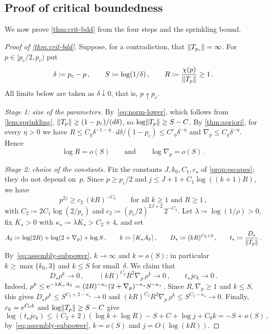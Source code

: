 \subsection{Proof of critical boundedness}\label{sec:assembly}

We now prove \cref{thm:crit-bdd} from the four steps and the sprinkling bound.

\begin{proof}[Proof of \cref{thm:crit-bdd}]
Suppose, for a contradiction, that $\lVert T_{p_c}\rVert=\infty$. For $p\in[p_c/2,p_c)$ put
\begin{equation*}
  \delta\coloneqq p_c-p\,,\qquad S\coloneqq\log(1/\delta)\,,\qquad R\coloneqq\frac{\chi(p)}{\lVert T_p\rVert}\ge1\,.
\end{equation*}
All limits below are taken as $\delta\downarrow0$, that is, $p\uparrow p_c$.

\emph{Stage 1: size of the parameters.}
By~\eqref{eq:norm-lower}, which follows from \cref{lem:sprinkling}, $\lVert T_p\rVert\ge(1-p_c)/(d\delta)$,
so $\log\lVert T_p\rVert\ge S-C$. By
\cref{thm:apriori}, for every $\eta>0$ we have $R\le C_\eta\delta^{-1-\eta}\cdot d\delta/(1-p_c)\le
C'_\eta\delta^{-\eta}$ and $\nabla_p\le C_\eta\delta^{-\eta}$. Hence
\begin{equation}\label{eq:assembly-subpower}
  \log R=o(S)\qquad\text{and}\qquad\log\nabla_p=o(S)\,.
\end{equation}

\emph{Stage 2: choice of the constants.}
Fix the constants $J,k_0,C_1,c_\star$ of \cref{prop:escapes}; they do not depend on~$p$. Since $p\ge p_c/2$ and $j\le J+1+C_1\log((k+1)R)$, we have
\begin{equation}\label{eq:assembly-pj}
  p^{2j}\ge c_2\,(kR)^{-C_2}\qquad\text{for all }k\ge1\text{ and }R\ge1\,,
\end{equation}
with $C_2\coloneqq2C_1\log(2/p_c)$ and $c_2\coloneqq(p_c/2)^{2J+2}\,2^{-C_2}$. Let
$\lambda\coloneqq\log(1/\rho)>0$, fix $K_\star>0$ with $\kappa_\star\coloneqq\lambda K_\star>C_2+4$, and set
\begin{equation*}
  A_\delta\coloneqq\log(2R)+\log(2+\nabla_p)+\log S\,,\qquad
  k\coloneqq\lceil K_\star A_\delta\rceil\,,\qquad
  D_\star\coloneqq(kR)^{C_2+2}\,,\qquad
  t_\star\coloneqq\frac{D_\star}{\lVert T_p\rVert}\,.
\end{equation*}
By~\eqref{eq:assembly-subpower}, $k\to\infty$ and $k=o(S)$; in particular $k\ge\max\{k_0,3\}$ and
$k\le S$ for small~$\delta$. We claim that
\begin{equation}\label{eq:assembly-small}
  D_\star\rho^k\to0\,,\qquad(kR)^{C_2}R^2\nabla_p\,\rho^k\to0\,,\qquad t_\star jc_k\to0\,.
\end{equation}
Indeed, $\rho^k\le\mathrm{e}^{-\lambda K_\star A_\delta}=(2R)^{-\kappa_\star}(2+\nabla_p)^{-\kappa_\star}
S^{-\kappa_\star}$. Since $R,\nabla_p\ge1$ and $k\le S$, this gives
$D_\star\rho^k\le S^{C_2+2-\kappa_\star}\to0$ and
$(kR)^{C_2}R^2\nabla_p\,\rho^k\le S^{C_2-\kappa_\star}\to0$. Finally, $c_k=\mathrm{e}^{C_0k}$ and
$\log\lVert T_p\rVert\ge S-C$ give
\begin{equation*}
  \log(t_\star jc_k)\le(C_2+2)(\log k+\log R)-S+C+\log j+C_0k=-S+o(S)\,,
\end{equation*}
by~\eqref{eq:assembly-subpower}, $k=o(S)$ and $j=O(\log(kR))$.


\end{proof}
